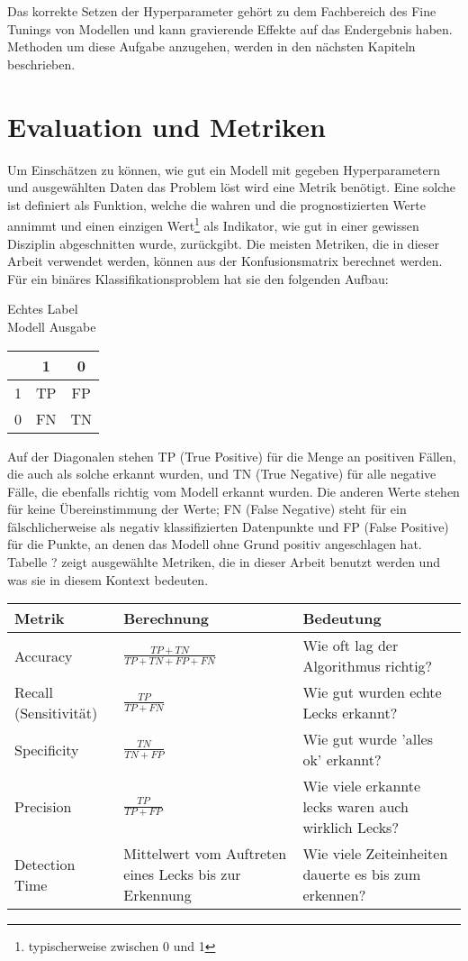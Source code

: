 Das korrekte Setzen der Hyperparameter gehört zu dem Fachbereich des Fine Tunings von Modellen und kann
 gravierende Effekte auf das Endergebnis haben. Methoden um diese Aufgabe anzugehen, werden in den
 nächsten Kapiteln beschrieben.


\section{Evaluation und Metriken}

Um Einschätzen zu können, wie gut ein Modell mit gegeben Hyperparametern und ausgewählten Daten das Problem
 löst wird eine Metrik benötigt. Eine solche ist definiert als Funktion, welche die wahren und die
 prognostizierten Werte annimmt und einen einzigen Wert\footnote{typischerweise zwischen 0 und 1} als
 Indikator, wie gut in einer gewissen Disziplin abgeschnitten wurde, zurückgibt. Die meisten Metriken,
 die in dieser Arbeit verwendet werden, können aus der Konfusionsmatrix berechnet werden. Für ein binäres
 Klassifikationsproblem hat sie den folgenden Aufbau:

\begin{center}
    \hspace{3.1cm}Echtes Label \\ Modell Ausgabe
    \begin{tabular}{ c | c c | }
      & 1 & 0 \\ 
     \hline
     1 & TP & FP \\  
     0 & FN & TN \\
     \hline  
    \end{tabular}
\end{center}

Auf der Diagonalen stehen TP (True Positive) für die Menge an positiven Fällen, die auch als solche erkannt
 wurden, und TN (True Negative) für alle negative Fälle, die ebenfalls richtig vom Modell erkannt wurden.
 Die anderen Werte stehen für keine Übereinstimmung der Werte; FN (False Negative) steht für ein fälschlicherweise
 als negativ klassifizierten Datenpunkte und FP (False Positive) für die Punkte, an denen das Modell ohne Grund
 positiv angeschlagen hat. Tabelle ? zeigt ausgewählte Metriken, die in dieser Arbeit benutzt werden und was sie
 in diesem Kontext bedeuten.

 \renewcommand{\arraystretch}{2}
\begin{tabular}{ m{6em} m{7em} m{16em} }
    Metrik & Berechnung & Bedeutung \\
    \hline
    Accuracy              & $\frac{TP+TN}{TP+TN+FP+FN}$ & Wie oft lag der Algorithmus richtig? \\
    Recall (Sensitivität) & $\frac{TP}{TP+FN}$          & Wie gut wurden echte Lecks erkannt? \\
    Specificity           & $\frac{TN}{TN+FP}$          & Wie gut wurde 'alles ok' erkannt? \\
    Precision             & $\frac{TP}{TP+FP}$          & Wie viele erkannte lecks waren auch wirklich Lecks? \\
    Detection Time        & Mittelwert vom Auftreten eines Lecks bis zur Erkennung & Wie viele Zeiteinheiten dauerte es bis zum erkennen?
\end{tabular}

